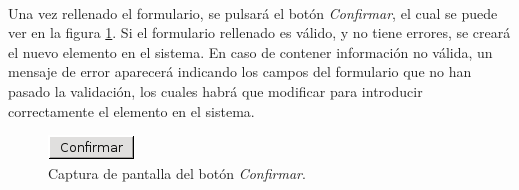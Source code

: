   \paragraph{}Una vez rellenado el formulario, se pulsará el botón
  \textit{Confirmar}, el cual se puede ver en la figura
  \ref{capturaBotonConfirmar}. Si el formulario rellenado es válido, y no tiene
  errores, se creará el nuevo elemento en el sistema. En caso de contener
  información no válida, un mensaje de error aparecerá indicando los campos
  del formulario que no han pasado la validación, los cuales habrá que modificar
  para introducir correctamente el elemento en el sistema.

  \begin{figure}[!ht]
    \begin{center}
      \includegraphics[scale=0.55]{4.Funcionamiento_Aplicacion/4.3.Gestion/4.3.1.Administrador_Principal/4.3.1.1.Introduccion/botonConfirmar.png}
      \caption{Captura de pantalla del botón \textit{Confirmar}.}
      \label{capturaBotonConfirmar}
    \end{center}
  \end{figure}
